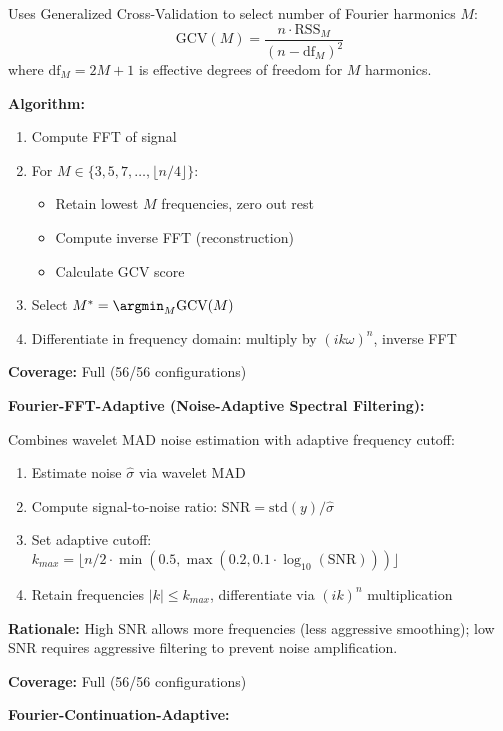Uses Generalized Cross-Validation to select number of Fourier harmonics $M$:
\begin{equation}
\text{GCV}(M) = \frac{n \cdot \text{RSS}_M}{(n - \text{df}_M)^2}
\end{equation}
where $\text{df}_M = 2M + 1$ is effective degrees of freedom for $M$ harmonics.

\textbf{Algorithm:}
\begin{enumerate}
    \item Compute FFT of signal
    \item For $M \in \{3, 5, 7, \ldots, \lfloor n/4 \rfloor\}$:
    \begin{itemize}
        \item Retain lowest $M$ frequencies, zero out rest
        \item Compute inverse FFT (reconstruction)
        \item Calculate GCV score
    \end{itemize}
    \item Select $M^* = \argmin_M \text{GCV}(M)$
    \item Differentiate in frequency domain: multiply by $(ik\omega)^n$, inverse FFT
\end{enumerate}

\textbf{Coverage:} Full (56/56 configurations)

\textbf{Fourier-FFT-Adaptive (Noise-Adaptive Spectral Filtering):}

Combines wavelet MAD noise estimation with adaptive frequency cutoff:
\begin{enumerate}
    \item Estimate noise $\hat{\sigma}$ via wavelet MAD
    \item Compute signal-to-noise ratio: $\text{SNR} = \text{std}(y) / \hat{\sigma}$
    \item Set adaptive cutoff: $k_{max} = \lfloor n/2 \cdot \min(0.5, \max(0.2, 0.1 \cdot \log_{10}(\text{SNR}))) \rfloor$
    \item Retain frequencies $|k| \leq k_{max}$, differentiate via $(ik)^n$ multiplication
\end{enumerate}

\textbf{Rationale:} High SNR allows more frequencies (less aggressive smoothing); low SNR requires aggressive filtering to prevent noise amplification.

\textbf{Coverage:} Full (56/56 configurations)

\textbf{Fourier-Continuation-Adaptive:}

